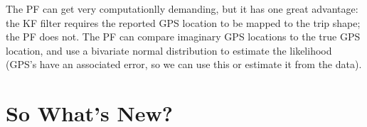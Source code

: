 \documentclass[12pt,a4paper]{article}
\begin{document}
The PF can get very computationlly demanding, but it has one great advantage:
the KF filter requires the reported GPS location to be mapped to the trip shape;
the PF does not.
The PF can compare imaginary GPS locations to the true GPS location, and use a bivariate normal distribution
to estimate the likelihood (GPS's have an associated error, so we can use this or estimate it from the data).












\section{So What's New?}
\label{sec:whatsnew}















\end{document}
